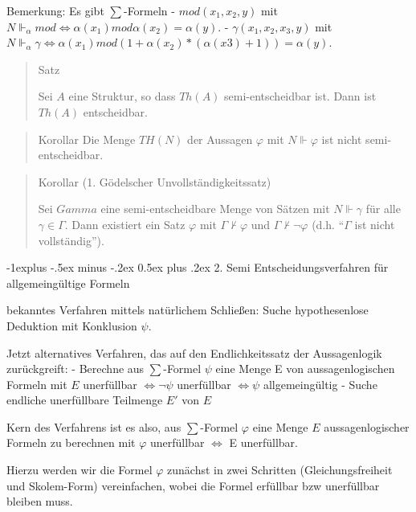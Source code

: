 \documentclass[a4paper]{article}
\makeatletter
\renewcommand{\subsection}{\@startsection{subsection}{2}{0mm}%
                {-1explus -.5ex minus -.2ex}%
                {0.5ex plus .2ex}%
                {\normalfont\normalsize\bfseries}}
\makeatother
\begin{document}
\begin{multicols}{3}
  Bemerkung: Es gibt $\sum$-Formeln - $mod(x_1,x_2 ,y)$ mit
  $N\Vdash_{\alpha} mod \Leftrightarrow \alpha (x_1) mod\alpha (x_2) =\alpha (y)$.
  - $\gamma(x_1 ,x_2 ,x_3 ,y)$ mit
  $N\Vdash_{\alpha} \gamma\Leftrightarrow \alpha(x_1) mod(1+\alpha(x_2)*(\alpha (x3)+1)) =\alpha (y)$.

  \begin{quote}
    Satz

    Sei $A$ eine Struktur, so dass $Th(A)$ semi-entscheidbar ist. Dann ist
    $Th(A)$ entscheidbar.
  \end{quote}

  \begin{quote}
    Korollar Die Menge $TH(N)$ der Aussagen $\varphi$ mit $N\Vdash\varphi$
    ist nicht semi-entscheidbar.
  \end{quote}

  \begin{quote}
    Korollar (1. Gödelscher Unvollständigkeitssatz)

    Sei $Gamma$ eine semi-entscheidbare Menge von Sätzen mit $N\Vdash\gamma$
    für alle $\gamma\in\Gamma$. Dann existiert ein Satz $\varphi$ mit
    $\Gamma\not\vdash\varphi$ und $\Gamma\not\vdash\lnot\varphi$ (d.h.
    ``$\Gamma$ ist nicht vollständig'').
  \end{quote}

  \subsection{2. Semi Entscheidungsverfahren für allgemeingültige
    Formeln}\label{semi-entscheidungsverfahren-fuxfcr-allgemeinguxfcltige-formeln}

  bekanntes Verfahren mittels natürlichem Schließen: Suche hypothesenlose
  Deduktion mit Konklusion $\psi$.

  Jetzt alternatives Verfahren, das auf den Endlichkeitssatz der
  Aussagenlogik zurückgreift: - Berechne aus $\sum$-Formel $\psi$ eine
  Menge E von aussagenlogischen Formeln mit $E$ unerfüllbar
  $\Leftrightarrow\lnot\psi$ unerfüllbar $\Leftrightarrow\psi$
  allgemeingültig - Suche endliche unerfüllbare Teilmenge $E'$ von $E$

  Kern des Verfahrens ist es also, aus $\sum$-Formel $\varphi$ eine Menge
  $E$ aussagenlogischer Formeln zu berechnen mit $\varphi$ unerfüllbar
  $\Leftrightarrow$ E unerfüllbar.

  Hierzu werden wir die Formel $\varphi$ zunächst in zwei Schritten
  (Gleichungsfreiheit und Skolem-Form) vereinfachen, wobei die Formel
  erfüllbar bzw unerfüllbar bleiben muss.


\end{multicols}
\end{document}
